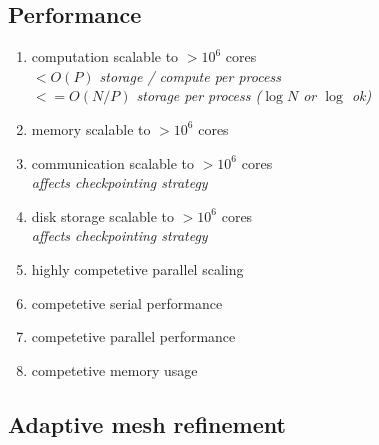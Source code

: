 \documentclass{article}
\begin{document}
\subsection{Performance}

\begin{enumerate}
    \item computation scalable to $> 10^6$ cores
      \\ \textit{$< O(P)$ storage / compute per process }
      \\ \textit{$<= O(N/P)$ storage per process ($\log N$ or $\log $ ok) }
    \item memory scalable to $> 10^6$ cores
    \item communication  scalable to $> 10^6$ cores
       \\ \textit{affects checkpointing strategy}
    \item disk storage  scalable to $> 10^6$ cores
       \\ \textit{affects checkpointing strategy}
    \item highly competetive parallel scaling
    \item competetive serial performance
    \item competetive parallel performance
    \item competetive memory usage
\end{enumerate}

\subsection{Adaptive mesh refinement}
\end{document}
